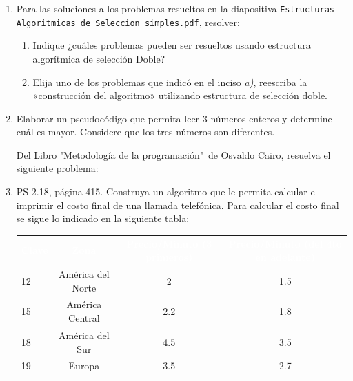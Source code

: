 \documentclass[spanish,11pt,twoside]{article}
\newcommand{\head}[1]{ %
	\textcolor{white}{\textbf{#1}}}
\renewcommand{\arraystretch}{1.5} %
\begin{document}
\begin{enumerate}
	\item Para las soluciones a los problemas resueltos en la diapositiva \texttt{Estructuras Algoritmicas de Seleccion simples.pdf}, resolver:
	\begin{enumerate}
		\item Indique ¿cuáles problemas pueden ser resueltos usando estructura algorítmica de selección Doble?
		\item Elija uno de los problemas que indicó en el inciso \textit{a)}, reescriba la «construcción del algoritmo» utilizando estructura de selección doble.
	\end{enumerate}
	

	\item Elaborar un pseudocódigo que permita leer 3 números enteros y determine cuál es mayor. Considere que los tres números son diferentes.	
	
	
	\vspace{24pt}

	Del Libro "Metodología de la programación"\ de Osvaldo Cairo, resuelva el siguiente
	problema:
	
	
	
	\item PS 2.18, página 415. Construya un algoritmo que le permita calcular e imprimir el costo final de una llamada telefónica. Para calcular el costo final se sigue lo indicado en la siguiente tabla:
	
	\begin{table}[H]%
		\renewcommand{\arraystretch}{1.5} %
		\centering\footnotesize%
		\sffamily%
		
		\label{table:problemas:llamada}
		\begin{tabular}{lccc}
			\rowcolor{uasblue}%
			\head{Clave}& \head{Zona} 		& \head{Precio/Minuto (3 primeros)} & \head{Precio/Minuto (del 4to en adelante)}\\
			12 			& América del Norte	& 2									& 1.5 \\
			15			& América Central	& 2.2								& 1.8 \\
			18			& América del Sur	& 4.5								& 3.5 \\
			19			& Europa			& 3.5								& 2.7 \\
		\end{tabular}
	\end{table}
	
\end{enumerate}
\end{document}

